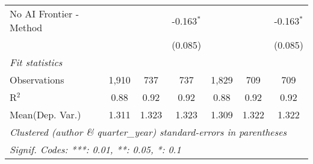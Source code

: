 \begin{tabular}{lcccccc}
   No AI Frontier - Method &              &               & -0.163$^{*}$  &         &              & -0.163$^{*}$\\   
                           &              &               & (0.085)       &         &              & (0.085)\\   
   \midrule
   \emph{Fit statistics}\\
   Observations            & 1,910        & 737           & 737           & 1,829   & 709          & 709\\  
   R$^2$                   & 0.88         & 0.92          & 0.92          & 0.88    & 0.92         & 0.92\\  
Mean(Dep. Var.) & 1.311 & 1.323 & 1.323 & 1.309 & 1.322 & 1.322 \\
   \midrule \midrule
   \multicolumn{7}{l}{\emph{Clustered (author \& quarter\_year) standard-errors in parentheses}}\\
   \multicolumn{7}{l}{\emph{Signif. Codes: ***: 0.01, **: 0.05, *: 0.1}}\\
\end{tabular}
\par\endgroup
